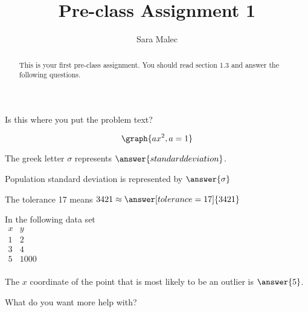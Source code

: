 \documentclass[handout]{ximera}
\title{Pre-class Assignment 1}
\author{Sara Malec}
\begin{document}
\begin{abstract}
  This is your first pre-class assignment. You should read section 1.3 and answer the following questions.
\end{abstract}
\maketitle


\begin{problem} Is this where you put the problem text?
\begin{multipleChoice}
\end{multipleChoice}
\end{problem}

\begin{problem}
   \[ 
   \graph{ax^2, a=1}
   \]
\end{problem}

\begin{problem}
    The greek letter $\sigma$ represents $\answer{standard deviation}$.
\end{problem}

\begin{problem}
    Population standard deviation is represented by $\answer{\sigma}$
\end{problem}

\begin{problem}
   The tolerance 17 means $3421 \approx \answer[tolerance=17]{3421}$
\end{problem}

\begin{problem}
    In the following data set\\
    
$\begin{array}{c|c}
    x&y\\
    \hline
    1&2\\
    3&4\\
    5&1000\\
\end{array}$
    
    
    The $x$ coordinate of the point that is most likely to be an outlier is $\answer{5}$.
\end{problem}

\begin{problem}
\begin{freeResponse}
What do you want more help with?
\end{freeResponse}
\end{problem}
\end{document}
